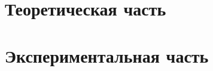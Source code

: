 \documentclass[a4paper,14pt]{extarticle}
\numberwithin{equation}{subsection}
\begin{document}

\newpage

\tableofcontents

\newpage



\newpage
\section{Теоретическая часть}












% 

\newpage

\section{Экспериментальная часть}





\newpage


\newpage
\printbibliography
\end{document}
